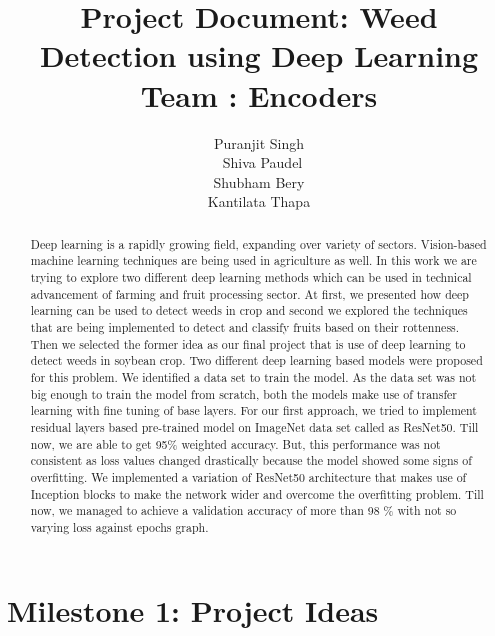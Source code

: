 \documentclass{report}
\title{Project Document: Weed Detection using Deep Learning \\ Team : Encoders}
\author{
Puranjit Singh\\\
Shiva Paudel\\
Shubham Bery\\
Kantilata Thapa\\
}
\date{}
\begin{document}
\maketitle

\tableofcontents

\begin{abstract}
Deep learning is a rapidly growing field, expanding over variety of sectors. Vision-based machine learning techniques are being used in agriculture as well. In this work we are trying to explore two different deep learning methods which can be used in technical advancement of farming and fruit processing sector. At first, we presented how deep learning can be used to detect weeds in crop and second we explored the techniques that are being implemented to detect and classify fruits based on their rottenness. Then we selected the former idea as our final project that is use of deep learning to detect weeds in soybean crop. Two different deep learning based models were proposed for this problem. We identified a data set to train the model. As the data set was not big enough to train the model from scratch, both the models make use of transfer learning with fine tuning of base layers. For our first approach, we tried to implement residual layers based pre-trained model on ImageNet data set called as ResNet50. Till now, we are able to get 95\% weighted accuracy. But, this performance was not consistent as loss values changed drastically because the model showed some signs of overfitting. We implemented a variation of ResNet50 architecture that makes use of Inception blocks to make the network wider and overcome the overfitting problem. Till now, we managed to achieve a validation accuracy of more than 98 \% with not so varying loss against epochs graph.
\end{abstract}

\chapter{Milestone 1: Project Ideas}
\end{document}
